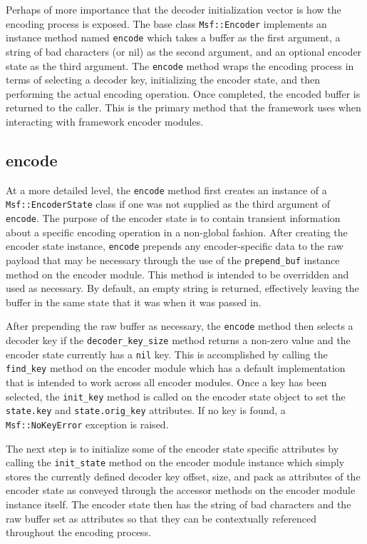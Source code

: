 \documentclass{report}
\begin{document}
\par
Perhaps of more importance that the decoder initialization vector is
how the encoding process is exposed.  The base class
\texttt{Msf::Encoder} implements an instance method named
\texttt{encode} which takes a buffer as the first argument, a string
of bad characters (or nil) as the second argument, and an optional
encoder state as the third argument.  The \texttt{encode} method
wraps the encoding process in terms of selecting a decoder key,
initializing the encoder state, and then performing the actual
encoding operation.  Once completed, the encoded buffer is returned
to the caller.  This is the primary method that the framework uses
when interacting with framework encoder modules.

        \subsection{encode}

\par
At a more detailed level, the \texttt{encode} method first creates
an instance of a \texttt{Msf::EncoderState} class if one was not
supplied as the third argument of \texttt{encode}.  The purpose of
the encoder state is to contain transient information about a
specific encoding operation in a non-global fashion.  After creating
the encoder state instance, \texttt{encode} prepends any
encoder-specific data to the raw payload that may be necessary
through the use of the \texttt{prepend\_buf} instance method on the
encoder module.  This method is intended to be overridden and used
as necessary.  By default, an empty string is returned, effectively
leaving the buffer in the same state that it was when it was passed
in.

\par
After prepending the raw buffer as necessary, the \texttt{encode}
method then selects a decoder key if the \texttt{decoder\_key\_size}
method returns a non-zero value and the encoder state currently has
a \texttt{nil} key.  This is accomplished by calling the
\texttt{find\_key} method on the encoder module which has a default
implementation that is intended to work across all encoder modules.
Once a key has been selected, the \texttt{init\_key} method is
called on the encoder state object to set the \texttt{state.key} and
\texttt{state.orig\_key} attributes.  If no key is found, a
\texttt{Msf::NoKeyError} exception is raised.

\par
The next step is to initialize some of the encoder state specific
attributes by calling the \texttt{init\_state} method on the encoder
module instance which simply stores the currently defined decoder
key offset, size, and pack as attributes of the encoder state as
conveyed through the accessor methods on the encoder module instance
itself.  The encoder state then has the string of bad characters and
the raw buffer set as attributes so that they can be contextually
referenced throughout the encoding process.
\end{document}
